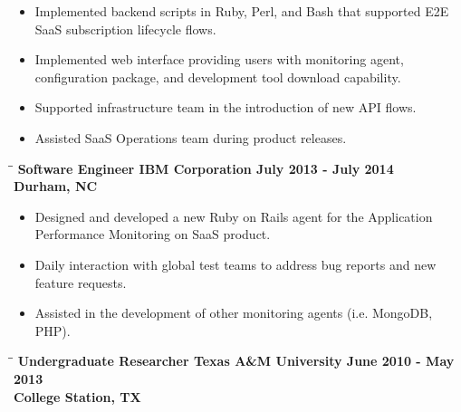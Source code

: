 \documentclass[8pt]{res}
\begin{document}
\begin{resume}
\begin{itemize}
      \item Implemented backend scripts in Ruby, Perl, and Bash that supported E2E SaaS subscription lifecycle flows.
      \item Implemented web interface providing users with monitoring agent, configuration package, and development tool download capability.
      \item Supported infrastructure team in the introduction of new API flows.
      \item Assisted SaaS Operations team during product releases.
    \end{itemize}\vspace{-18pt}      %
    \begin{tabbing}
      \hspace{2.3in}\= \hspace{2.6in}\= \kill %
      \bf Software Engineer \>\bf IBM Corporation \>\bf July 2013 - July 2014\\ \>\bf Durham, NC
    \end{tabbing}\vspace{-10pt}      %
    \begin{itemize}
      \item Designed and developed a new Ruby on Rails agent for the Application Performance Monitoring on SaaS product.
      \item Daily interaction with global test teams to address bug reports and new feature requests.
      \item Assisted in the development of other monitoring agents (i.e. MongoDB, PHP).
    \end{itemize}\vspace{-18pt}      %
    \begin{tabbing}
      \hspace{2.3in}\= \hspace{2.6in}\= \kill %
      \bf Undergraduate Researcher \>\bf Texas A\&M University \>\bf June 2010 - May 2013\\ \>\bf College Station, TX
    \end{tabbing}\vspace{-10pt}      %
    \begin{itemize}

\end{itemize}
\end{resume}
\end{document}
